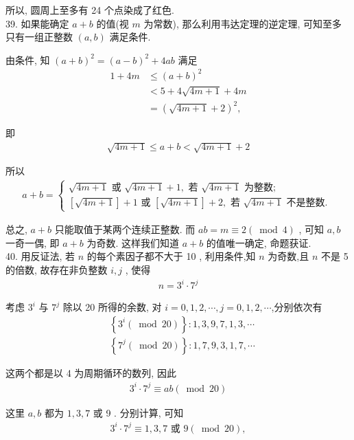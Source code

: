 所以, 圆周上至多有 24 个点染成了红色. \\
39. 如果能确定 $a+b$ 的值(视 $m$ 为常数), 那么利用韦达定理的逆定理, 可知至多只有一组正整数 $(a, b)$ 满足条件.

由条件, 知 $(a+b)^{2}=(a-b)^{2}+4 a b$ 满足\begin{align}
	1+4 m & \leqslant(a+b)^{2}     \\
	      & <5+4 \sqrt{4 m+1}+4 m  \\
	      & =(\sqrt{4 m+1}+2)^{2},
\end{align}

即
\begin{align*}
	\sqrt{4 m+1} \leqslant a+b<\sqrt{4 m+1}+2
\end{align*}

所以
\begin{align*}
	a+b=\left\{\begin{array}{l}
		           \sqrt{4 m+1} \text { 或 } \sqrt{4 m+1}+1, \text { 若 } \sqrt{4 m+1} \text { 为整数; } \\
		           {[\sqrt{4 m+1}]+1 \text { 或 }[\sqrt{4 m+1}]+2, \text { 若 } \sqrt{4 m+1} \text { 不是整数. }}
	           \end{array}\right.
\end{align*}

总之,  $a+b$ 只能取值于某两个连续正整数. 而 $a b=m \equiv 2(\bmod 4)$ , 可知 $a ,  b$ 一奇一偶, 即 $a+b$ 为奇数. 这样我们知道 $a+b$ 的值唯一确定, 命题获证. \\
40. 用反证法, 若 $n$ 的每个素因子都不大于 10 , 利用条件,知 $n$ 为奇数,且 $n$ 不是 5 的倍数, 故存在非负整数 $i ,  j$ , 使得
\begin{align*}
	n=3^{i} \cdot 7^{j}
\end{align*}

考虑 $3^{i}$ 与 $7^{j}$ 除以 20 所得的余数, 对 $i=0,1,2, \cdots, j=0,1,2, \cdots$,分别依次有\begin{align}
	 & \left\{3^{i}(\bmod 20)\right\}: 1,3,9,7,1,3, \cdots \\
	 & \left\{7^{j}(\bmod 20)\right\}: 1,7,9,3,1,7, \cdots
\end{align}

这两个都是以 4 为周期循环的数列, 因此
\begin{align*}
	3^{i} \cdot 7^{j} \equiv a b(\bmod 20)
\end{align*}

这里 $a ,  b$ 都为 $1,3,7$ 或 9 . 分别计算, 可知
\begin{align*}
	3^{i} \cdot 7^{j} \equiv 1,3,7 \text { 或 } 9(\bmod 20),
\end{align*}

